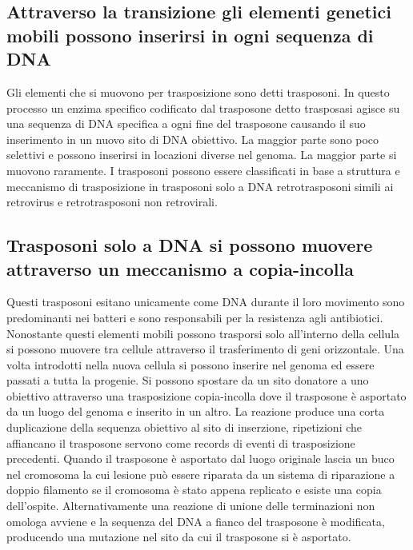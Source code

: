 \subsection{Attraverso la transizione gli elementi genetici mobili possono inserirsi in ogni sequenza di DNA}
Gli elementi che si muovono per trasposizione sono detti trasposoni. In questo processo un enzima specifico codificato dal trasposone detto trasposasi agisce su una sequenza di DNA
specifica a ogni fine del trasposone causando il suo inserimento in un nuovo sito di DNA obiettivo. La maggior parte sono poco selettivi e possono inserirsi in locazioni diverse nel
genoma. La maggior parte si muovono raramente. I trasposoni possono essere classificati in base a struttura e meccanismo di trasposizione in trasposoni solo a DNA retrotrasposoni simili
ai retrovirus e retrotrasposoni non retrovirali. 
\subsection{Trasposoni solo a DNA si possono muovere attraverso un meccanismo a copia-incolla}
Questi trasposoni esitano unicamente come DNA durante il loro movimento sono predominanti nei batteri e sono responsabili per la resistenza agli antibiotici. Nonostante questi elementi
mobili possono trasporsi solo all'interno della cellula si possono muovere tra cellule attraverso il trasferimento di geni orizzontale. Una volta introdotti nella nuova cellula si 
possono inserire nel genoma ed essere passati a tutta la progenie. Si possono spostare da un sito donatore a uno obiettivo attraverso una trasposizione copia-incolla dove il trasposone 
\`e asportato da un luogo del genoma e inserito in un altro. La reazione produce una corta duplicazione della sequenza obiettivo al sito di inserzione, ripetizioni che affiancano il 
trasposone servono come records di eventi di trasposizione precedenti. Quando il trasposone \`e asportato dal luogo originale lascia un buco nel cromosoma la cui lesione pu\`o essere
riparata da un sistema di riparazione a doppio filamento se il cromosoma \`e stato appena replicato e esiste una copia dell'ospite. Alternativamente una reazione di unione delle 
terminazioni non omologa avviene e la sequenza del DNA a fianco del trasposone \`e modificata, producendo una mutazione nel sito da cui il trasposone si \`e asportato. 
